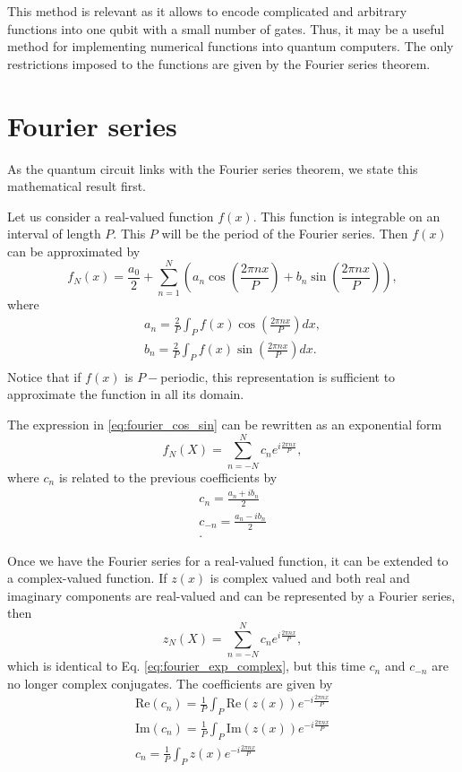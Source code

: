 \documentclass[aps,amssymb,amsmath,amsfonts,pra,superscriptaddress,onecolumn]{revtex4}
\begin{document}
This method is relevant as it allows to encode complicated and arbitrary functions into one qubit with a small number of gates. Thus, it may be a useful method for implementing numerical functions into quantum computers. The only restrictions imposed to the functions are given by the Fourier series theorem. 

\section{Fourier series}
As the quantum circuit links with the Fourier series theorem, we state this mathematical result first. 

Let us consider a real-valued function $f(x)$. This function is integrable on an interval of length $P$. This $P$ will be the period of the Fourier series. Then $f(x)$ can be approximated by
\begin{equation}\label{eq:fourier_cos_sin}
    f_N(x) = \frac{a_0}{2} + \sum_{n = 1}^N \left(a_n \cos\left(\frac{2\pi n x}{P}\right) + b_n \sin\left(\frac{2\pi n x}{P}\right)\right), 
\end{equation}
where
\begin{eqnarray}
    a_n = \frac{2}{P}\int_P f(x) \cos\left(\frac{2\pi n x}{P}\right) dx, \\
    b_n = \frac{2}{P}\int_P f(x) \sin\left(\frac{2\pi n x}{P}\right) dx . \\
\end{eqnarray}
Notice that if $f(x)$ is $P-$periodic, this representation is sufficient to approximate the function in all its domain.

The expression in \ref{eq:fourier_cos_sin} can be rewritten as an exponential form
\begin{equation}\label{eq:fourier_exp}
    f_N(X) = \sum_{n = -N}^N c_n e^{i \frac{2\pi n x}{P}},
\end{equation}
where $c_n$ is related to the previous coefficients by 
\begin{eqnarray}
    c_n = \frac{a_n + i b_n}{2} \\
    c_{-n} = \frac{a_n - i b_n}{2} \\.
\end{eqnarray}

Once we have the Fourier series for a real-valued function, it can be extended to a complex-valued function. If $z(x)$ is complex valued and both real and imaginary components are real-valued and can be represented by a Fourier series, then
\begin{equation}\label{eq:fourier_exp_complex}
    z_N(X) = \sum_{n = -N}^N c_n e^{i \frac{2\pi n x}{P}},
\end{equation}
which is identical to Eq. \eqref{eq:fourier_exp_complex}, but this time $c_n$ and $c_{-n}$ are no longer complex conjugates.
The coefficients are given by
\begin{eqnarray}
    \mathrm{Re}(c_n) = \frac{1}{P} \int_P \mathrm{Re}(z(x)) e^{-i\frac{2\pi n x}{P}} \\
    \mathrm{Im}(c_n) = \frac{1}{P} \int_P \mathrm{Im}(z(x)) e^{-i\frac{2\pi n x}{P}} \\
    c_n = \frac{1}{P} \int_P z(x) e^{-i\frac{2\pi n x}{P}}
\end{eqnarray}
\end{document}
